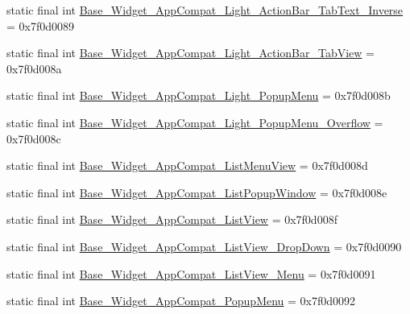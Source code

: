 \begin{DoxyCompactItemize}
static final int \mbox{\hyperlink{classandroid_1_1support_1_1v7_1_1appcompat_1_1_r_1_1style_ae38a524df3514da4bd318b3c6d375194}{Base\+\_\+\+Widget\+\_\+\+App\+Compat\+\_\+\+Light\+\_\+\+Action\+Bar\+\_\+\+Tab\+Text\+\_\+\+Inverse}} = 0x7f0d0089
\item 
static final int \mbox{\hyperlink{classandroid_1_1support_1_1v7_1_1appcompat_1_1_r_1_1style_aac1ceb67855c4caadba59914e549affe}{Base\+\_\+\+Widget\+\_\+\+App\+Compat\+\_\+\+Light\+\_\+\+Action\+Bar\+\_\+\+Tab\+View}} = 0x7f0d008a
\item 
static final int \mbox{\hyperlink{classandroid_1_1support_1_1v7_1_1appcompat_1_1_r_1_1style_a50f811d977ea50bc76491f4c9261b8c0}{Base\+\_\+\+Widget\+\_\+\+App\+Compat\+\_\+\+Light\+\_\+\+Popup\+Menu}} = 0x7f0d008b
\item 
static final int \mbox{\hyperlink{classandroid_1_1support_1_1v7_1_1appcompat_1_1_r_1_1style_a3de145bd9f6d8e62d338bf486619da5b}{Base\+\_\+\+Widget\+\_\+\+App\+Compat\+\_\+\+Light\+\_\+\+Popup\+Menu\+\_\+\+Overflow}} = 0x7f0d008c
\item 
static final int \mbox{\hyperlink{classandroid_1_1support_1_1v7_1_1appcompat_1_1_r_1_1style_afbcc6cc370144b7990614ee39bd36197}{Base\+\_\+\+Widget\+\_\+\+App\+Compat\+\_\+\+List\+Menu\+View}} = 0x7f0d008d
\item 
static final int \mbox{\hyperlink{classandroid_1_1support_1_1v7_1_1appcompat_1_1_r_1_1style_a5a8c0b50418d32051e5f61365c8b8951}{Base\+\_\+\+Widget\+\_\+\+App\+Compat\+\_\+\+List\+Popup\+Window}} = 0x7f0d008e
\item 
static final int \mbox{\hyperlink{classandroid_1_1support_1_1v7_1_1appcompat_1_1_r_1_1style_aa10a4813e78697cb0b6a93321b659876}{Base\+\_\+\+Widget\+\_\+\+App\+Compat\+\_\+\+List\+View}} = 0x7f0d008f
\item 
static final int \mbox{\hyperlink{classandroid_1_1support_1_1v7_1_1appcompat_1_1_r_1_1style_a03f9bb002e1b5558f1c636204e2c8e67}{Base\+\_\+\+Widget\+\_\+\+App\+Compat\+\_\+\+List\+View\+\_\+\+Drop\+Down}} = 0x7f0d0090
\item 
static final int \mbox{\hyperlink{classandroid_1_1support_1_1v7_1_1appcompat_1_1_r_1_1style_a7cdf63459830b3d4f230ec698e252e41}{Base\+\_\+\+Widget\+\_\+\+App\+Compat\+\_\+\+List\+View\+\_\+\+Menu}} = 0x7f0d0091
\item 
static final int \mbox{\hyperlink{classandroid_1_1support_1_1v7_1_1appcompat_1_1_r_1_1style_aeb2e167384b173a5b7eccad9e709dc4d}{Base\+\_\+\+Widget\+\_\+\+App\+Compat\+\_\+\+Popup\+Menu}} = 0x7f0d0092
\item 

\end{DoxyCompactItemize}
